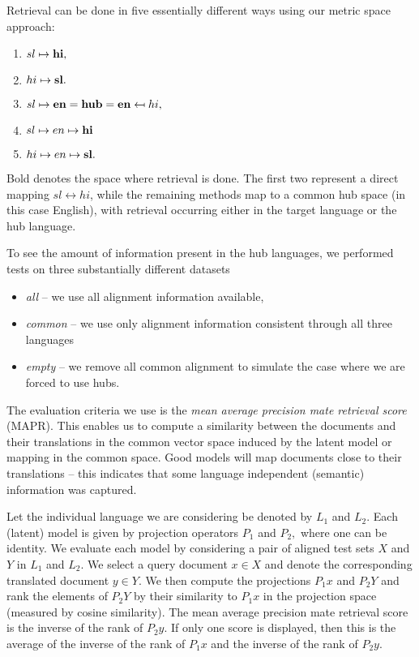 \documentclass[twocolumn, draft]{article}
\begin{document}
Retrieval can be done in five essentially different ways using
our metric space approach:
\begin{enumerate}
\item $sl\mapsto {\bf hi},$
\item $hi\mapsto {\bf sl}.$
\item $sl\mapsto {\bf en = hub = en} \mapsfrom
hi,$
\item $sl\mapsto
en \mapsto {\bf hi}$
\item $hi\mapsto en \mapsto {\bf sl}.$
\end{enumerate}
Bold denotes the space where retrieval is done. The first two
represent a direct mapping $sl \leftrightarrow hi$, while the
remaining methods map to a common hub space (in this case
English), with retrieval occurring either in the target language
or the hub language.

To see the amount of information present in the hub languages, we
performed tests on three substantially different datasets
\begin{itemize}
\item \emph{all} -- we use all alignment information available,
\item \emph{common} -- we use only alignment information consistent
through all three languages
\item  \emph{empty} -- we remove all common
alignment to simulate the case where we are forced to use hubs.
\end{itemize}

The evaluation criteria we use is the \emph{mean average
  precision mate retrieval score} (MAPR). This enables us to
compute a similarity between the documents and their translations
in the common vector space induced by the latent model or mapping
in the common space. Good models will map documents close to their
translations -- this indicates that some language independent
(semantic) information was captured.

Let the individual language we are considering be denoted by
$L_1$ and $L_2$.  Each (latent) model is given by projection
operators $P_1$ and $P_2,$ where one can be identity. We evaluate
each model by considering a pair of aligned test sets $X$ and
$Y$ in $L_1$ and $L_2$.
%
We select a query document $x \in X$ and denote the
corresponding translated document $y\in Y$.  We then compute
the projections $P_1 x$ and $P_2 Y$ and rank the elements of
$P_2 Y$ by their similarity to $P_1 x$ in the projection
space (measured by cosine similarity). The mean average precision
mate retrieval score is the inverse of the rank of $P_2 y$. If
only one score is displayed, then this is the average of the
inverse of the rank of $P_1 x$ and the inverse of the rank of
$P_2 y$.
\vspace{-0.2cm}
\end{document}
